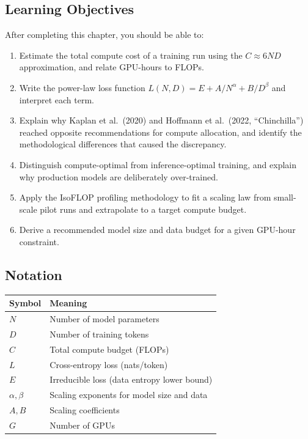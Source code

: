 \subsection*{Learning Objectives}

After completing this chapter, you should be able to:

\begin{enumerate}
  \item Estimate the total compute cost of a training run using the $C \approx 6ND$ approximation, and relate GPU-hours to FLOPs.
  \item Write the power-law loss function $L(N, D) = E + A/N^\alpha + B/D^\beta$ and interpret each term.
  \item Explain why Kaplan et al.\ (2020) and Hoffmann et al.\ (2022, ``Chinchilla'') reached opposite recommendations for compute allocation, and identify the methodological differences that caused the discrepancy.
  \item Distinguish compute-optimal from inference-optimal training, and explain why production models are deliberately over-trained.
  \item Apply the IsoFLOP profiling methodology to fit a scaling law from small-scale pilot runs and extrapolate to a target compute budget.
  \item Derive a recommended model size and data budget for a given GPU-hour constraint.
\end{enumerate}


\subsection*{Notation}

\begin{center}
\begin{tabular}{ll}
\toprule
Symbol & Meaning \\
\midrule
$N$ & Number of model parameters \\
$D$ & Number of training tokens \\
$C$ & Total compute budget (FLOPs) \\
$L$ & Cross-entropy loss (nats/token) \\
$E$ & Irreducible loss (data entropy lower bound) \\
$\alpha, \beta$ & Scaling exponents for model size and data \\
$A, B$ & Scaling coefficients \\
$G$ & Number of GPUs \\
\bottomrule
\end{tabular}
\end{center}


